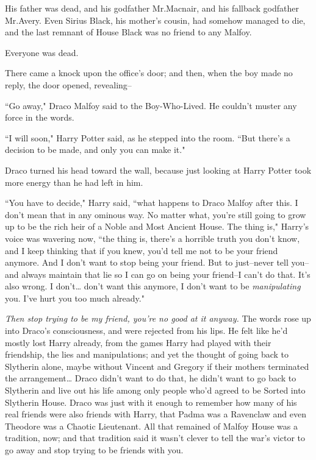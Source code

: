 His father was dead, and his godfather Mr.\?Macnair, and his fallback godfather Mr.\?Avery. Even Sirius Black, his mother's cousin, had somehow managed to die, and the last remnant of House Black was no friend to any Malfoy.

Everyone was dead.

There came a knock upon the office's door; and then, when the boy made no reply, the door opened, revealing\---

``Go away," Draco Malfoy said to the Boy-Who-Lived. He couldn't muster any force in the words.

``I will soon," Harry Potter said, as he stepped into the room. ``But there's a decision to be made, and only you can make it."

Draco turned his head toward the wall, because just looking at Harry Potter took more energy than he had left in him.

``You have to decide," Harry said, ``what happens to Draco Malfoy after this. I don't mean that in any ominous way. No matter what, you're still going to grow up to be the rich heir of a Noble and Most Ancient House. The thing is," Harry's voice was wavering now, ``the thing is, there's a horrible truth you don't know, and I keep thinking that if you knew, you'd tell me not to be your friend anymore. And I don't want to stop being your friend. But to just\---never tell you\---and always maintain that lie so I can go on being your friend\---I can't do that. It's also wrong. I don't{\ldots} don't want this anymore, I don't want to be \emph{manipulating} you. I've hurt you too much already."

\emph{Then stop trying to be my friend, you're no good at it anyway.} The words rose up into Draco's consciousness, and were rejected from his lips. He felt like he'd mostly lost Harry already, from the games Harry had played with their friendship, the lies and manipulations; and yet the thought of going back to Slytherin alone, maybe without Vincent and Gregory if their mothers terminated the arrangement{\ldots} Draco didn't want to do that, he didn't want to go back to Slytherin and live out his life among only people who'd agreed to be Sorted into Slytherin House. Draco was just with it enough to remember how many of his real friends were also friends with Harry, that Padma was a Ravenclaw and even Theodore was a Chaotic Lieutenant. All that remained of Malfoy House was a tradition, now; and that tradition said it wasn't clever to tell the war's victor to go away and stop trying to be friends with you.

